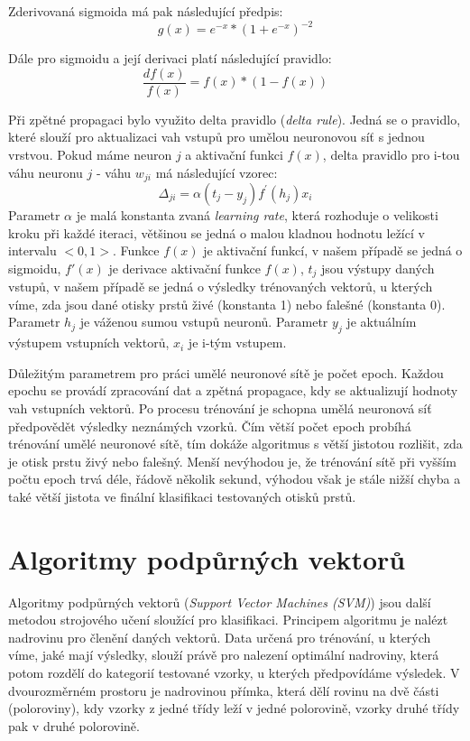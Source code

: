 Zderivovaná sigmoida má pak následující předpis:
$$g(x)=e^{-x}*{(1+e^{-x})}^{-2}$$

Dále pro sigmoidu a její derivaci platí následující pravidlo:
$$\frac{df(x)}{f(x)} = f(x)*(1-f(x))$$

Při zpětné propagaci bylo využito delta pravidlo (\textit{delta rule}). Jedná se o pravidlo, které slouží pro aktualizaci vah vstupů pro umělou neuronovou síť s jednou vrstvou. Pokud máme neuron $j$ a aktivační funkci $f(x)$, delta pravidlo pro i-tou váhu neuronu $j$ - váhu $w_{ji}$ má následující vzorec:
$$\Delta_{ji} = \alpha(t_j - y_j)f^{'}(h_j)x_i$$
Parametr $\alpha$ je malá konstanta zvaná \textit{learning rate}, která rozhoduje o velikosti kroku při každé iteraci, většinou se jedná o malou kladnou hodnotu ležící v intervalu $<0,1>$. \cite{LearningRate} Funkce $f(x)$ je aktivační funkcí, v našem případě se jedná o sigmoidu, $f'(x)$ je derivace aktivační funkce $f(x)$, $t_j$ jsou výstupy daných vstupů, v našem případě se jedná o výsledky trénovaných vektorů, u kterých víme, zda jsou dané otisky prstů živé (konstanta 1) nebo falešné (konstanta 0). Parametr $h_j$ je váženou sumou vstupů neuronů. Parametr $y_j$ je aktuálním výstupem vstupních vektorů, $x_i$ je i-tým vstupem. \cite{DeltaRule}

Důležitým parametrem pro práci umělé neuronové sítě je počet epoch. Každou epochu se provádí zpracování dat a zpětná propagace, kdy se aktualizují hodnoty vah vstupních vektorů. Po procesu trénování je schopna umělá neuronová síť předpovědět výsledky neznámých vzorků. Čím větší počet epoch probíhá trénování umělé neuronové sítě, tím dokáže algoritmus s větší jistotou rozlišit, zda je otisk prstu živý nebo falešný. Menší nevýhodou je, že trénování sítě při vyšším počtu epoch trvá déle, řádově několik sekund, výhodou však je stále nižší chyba a také větší jistota ve finální klasifikaci testovaných otisků prstů.


\section{Algoritmy podpůrných vektorů}
Algoritmy podpůrných vektorů (\textit{Support Vector Machines (SVM)}) jsou další metodou strojového učení sloužící pro klasifikaci. Principem algoritmu je nalézt nadrovinu pro členění daných vektorů. Data určená pro trénování, u kterých víme, jaké mají výsledky, slouží právě pro nalezení optimální nadroviny, která potom rozdělí do kategorií testované vzorky, u kterých předpovídáme výsledek. V dvourozměrném prostoru je nadrovinou přímka, která dělí rovinu na dvě části (poloroviny), kdy vzorky z jedné třídy leží v jedné polorovině, vzorky druhé třídy pak v druhé polorovině. 

